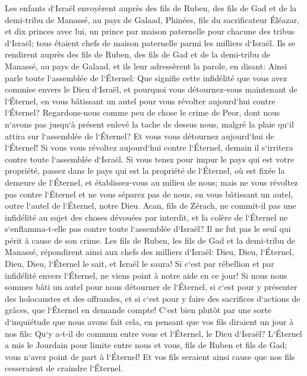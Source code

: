 \verse Les enfants d`Israël envoyèrent auprès des fils de Ruben, des fils de Gad et de la demi-tribu de Manassé, au pays de Galaad, Phinées, fils du sacrificateur Éléazar, 
\verse et dix princes avec lui, un prince par maison paternelle pour chacune des tribus d`Israël; tous étaient chefs de maison paternelle parmi les milliers d`Israël. 
\verse Ils se rendirent auprès des fils de Ruben, des fils de Gad et de la demi-tribu de Manassé, au pays de Galaad, et ils leur adressèrent la parole, en disant: 
\verse Ainsi parle toute l`assemblée de l`Éternel: Que signifie cette infidélité que vous avez commise envers le Dieu d`Israël, et pourquoi vous détournez-vous maintenant de l`Éternel, en vous bâtissant un autel pour vous révolter aujourd`hui contre l`Éternel? 
\verse Regardons-nous comme peu de chose le crime de Peor, dont nous n`avons pas jusqu`à présent enlevé la tache de dessus nous, malgré la plaie qu`il attira sur l`assemblée de l`Éternel? 
\verse Et vous vous détournez aujourd`hui de l`Éternel! Si vous vous révoltez aujourd`hui contre l`Éternel, demain il s`irritera contre toute l`assemblée d`Israël. 
\verse Si vous tenez pour impur le pays qui est votre propriété, passez dans le pays qui est la propriété de l`Éternel, où est fixée la demeure de l`Éternel, et établissez-vous au milieu de nous; mais ne vous révoltez pas contre l`Éternel et ne vous séparez pas de nous, en vous bâtissant un autel, outre l`autel de l`Éternel, notre Dieu. 
\verse Acan, fils de Zérach, ne commit-il pas une infidélité au sujet des choses dévouées par interdit, et la colère de l`Éternel ne s`enflamma-t-elle pas contre toute l`assemblée d`Israël? Il ne fut pas le seul qui périt à cause de son crime. 
\verse Les fils de Ruben, les fils de Gad et la demi-tribu de Manassé, répondirent ainsi aux chefs des milliers d`Israël: 
\verse Dieu, Dieu, l`Éternel, Dieu, Dieu, l`Éternel le sait, et Israël le saura! Si c`est par rébellion et par infidélité envers l`Éternel, ne viens point à notre aide en ce jour! 
\verse Si nous nous sommes bâti un autel pour nous détourner de l`Éternel, si c`est pour y présenter des holocaustes et des offrandes, et si c`est pour y faire des sacrifices d`actions de grâces, que l`Éternel en demande compte! 
\verse C`est bien plutôt par une sorte d`inquiétude que nous avons fait cela, en pensant que vos fils diraient un jour à nos fils: Qu`y a-t-il de commun entre vous et l`Éternel, le Dieu d`Israël? 
\verse L`Éternel a mis le Jourdain pour limite entre nous et vous, fils de Ruben et fils de Gad; vous n`avez point de part à l`Éternel! Et vos fils seraient ainsi cause que nos fils cesseraient de craindre l`Éternel. 
